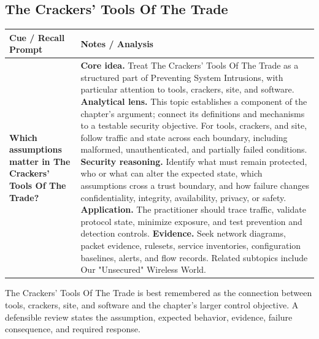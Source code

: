 \documentclass[11pt]{article}
\newcommand{\CornellHeader}{%
\rowcolor{Navy}\color{white}\bfseries Cue / Recall Prompt & \color{white}\bfseries Notes / Analysis\\\hline}
\newcommand{\CornellRow}[2]{%
\cellcolor{CueGray}\RaggedRight\textbf{#1} & \RaggedRight #2\\\hline}
\begin{document}
\subsection*{The Crackers' Tools Of The Trade}
\begin{longtable}{>{\RaggedRight\arraybackslash}p{}|>{\RaggedRight\arraybackslash}p{}}
\CornellHeader
\CornellRow{Which assumptions matter in The Crackers' Tools Of The Trade?}{\textbf{Core idea.} Treat The Crackers' Tools Of The Trade as a structured part of Preventing System Intrusions, with particular attention to tools, crackers, site, and software. \textbf{Analytical lens.} This topic establishes a component of the chapter's argument; connect its definitions and mechanisms to a testable security objective. For tools, crackers, and site, follow traffic and state across each boundary, including malformed, unauthenticated, and partially failed conditions. \textbf{Security reasoning.} Identify what must remain protected, who or what can alter the expected state, which assumptions cross a trust boundary, and how failure changes confidentiality, integrity, availability, privacy, or safety. \textbf{Application.} The practitioner should trace traffic, validate protocol state, minimize exposure, and test prevention and detection controls. \textbf{Evidence.} Seek network diagrams, packet evidence, rulesets, service inventories, configuration baselines, alerts, and flow records. Related subtopics include Our "Unsecured" Wireless World.}
\end{longtable}
\begin{topicsummary}
The Crackers' Tools Of The Trade is best remembered as the connection between tools, crackers, site, and software and the chapter's larger control objective. A defensible review states the assumption, expected behavior, evidence, failure consequence, and required response.
\end{topicsummary}
\end{document}
